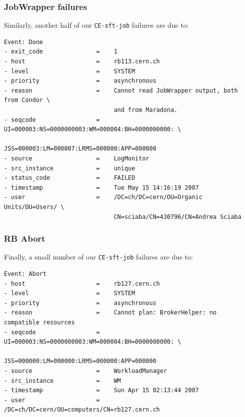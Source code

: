 \documentclass{beamer}
\begin{document}
\begin{frame}[fragile]
\frametitle{JobWrapper failures}
Similarly, another half of our {\tt CE-sft-job} failures are due to:
\scriptsize
\begin{verbatim}
Event: Done
- exit_code               =    1
- host                    =    rb113.cern.ch
- level                   =    SYSTEM
- priority                =    asynchronous
- reason                  =    Cannot read JobWrapper output, both from Condor \
                               and from Maradona.
- seqcode                 =    UI=000003:NS=0000000003:WM=000004:BH=0000000000: \
                               JSS=000003:LM=000007:LRMS=000000:APP=000000
- source                  =    LogMonitor
- src_instance            =    unique
- status_code             =    FAILED
- timestamp               =    Tue May 15 14:16:19 2007
- user                    =    /DC=ch/DC=cern/OU=Organic Units/OU=Users/ \
                               CN=sciaba/CN=430796/CN=Andrea Sciaba
\end{verbatim}
\end{frame}

\begin{frame}[fragile]
\frametitle{RB Abort}
Finally, a small number of our {\tt CE-sft-job} failures are due to:
\scriptsize
\begin{verbatim}
Event: Abort
- host                    =    rb127.cern.ch
- level                   =    SYSTEM
- priority                =    asynchronous
- reason                  =    Cannot plan: BrokerHelper: no compatible resources
- seqcode                 =    UI=000003:NS=0000000003:WM=000004:BH=0000000000: \
                               JSS=000000:LM=000000:LRMS=000000:APP=000000
- source                  =    WorkloadManager
- src_instance            =    WM
- timestamp               =    Sun Apr 15 02:13:44 2007
- user                    =    /DC=ch/DC=cern/OU=computers/CN=rb127.cern.ch
\end{verbatim}
\end{frame}
\end{document}
